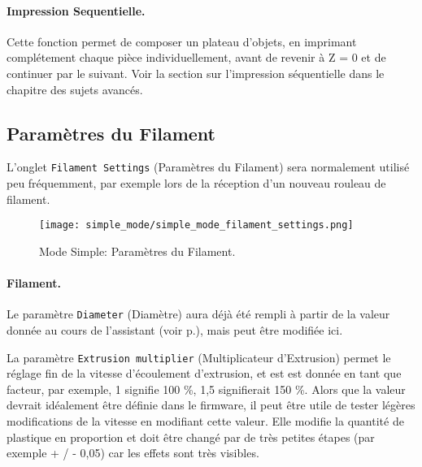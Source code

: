 
\paragraph{Impression Sequentielle.} %
\label{par:sequential_printing}
Cette fonction permet de composer un plateau d'objets, en imprimant complétement chaque pièce individuellement, avant de revenir à Z = 0 et de continuer par le suivant. Voir la section sur l'impression séquentielle dans le chapitre des sujets avancés.


\subsection{Paramètres du Filament}
L'onglet \texttt{Filament Settings} (Paramètres du Filament) sera normalement utilisé peu fréquemment, par exemple lors de la réception d'un nouveau rouleau de filament.

\begin{figure}[H]
\centering
\texttt{[image: simple\_mode/simple\_mode\_filament\_settings.png]}
\caption{Mode Simple: Paramètres du Filament.}
\label{fig:simple_mode_filament_settings}
\end{figure}

\paragraph{Filament.} %
\label{par:filament}
Le paramètre \texttt{Diameter} (Diamètre) aura déjà été rempli à partir de la valeur donnée au cours de l'assistant (voir p.\pageref{sub:4_filament_diameter}), mais peut être modifiée ici.

La paramètre \texttt{Extrusion multiplier} (Multiplicateur d'Extrusion) permet le réglage fin de la vitesse d'écoulement d'extrusion, et est est donnée en tant que facteur, par exemple, 1 signifie 100 \%, 1,5 signifierait 150 \%. Alors que la valeur devrait idéalement être définie dans le firmware, il peut être utile de tester légères modifications de la vitesse en modifiant cette valeur. Elle modifie la quantité de plastique en proportion et doit être changé par de très petites étapes (par exemple + / - 0,05) car les effets sont très visibles.

